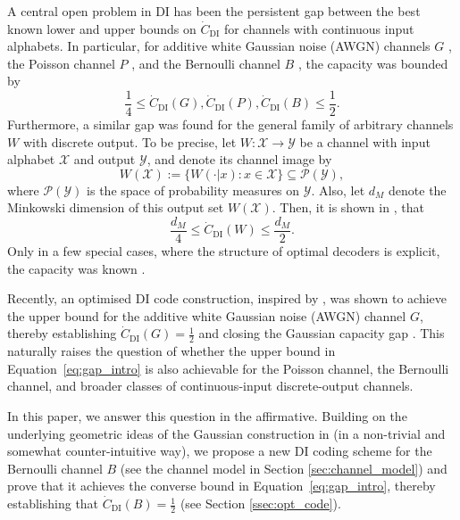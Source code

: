 \documentclass[10pt, conference]{IEEEtran}
\newcommand{\1}{\mathds{1}}
\newcommand{\cP}{\mathcal{P}}
\newcommand{\cX}{\mathcal{X}}
\newcommand{\cY}{\mathcal{Y}}
\begin{document}
A central open problem in DI has been the persistent gap between the best known lower and upper bounds on $\dot C_{\text{DI}}$ for channels with continuous input alphabets. In particular, for additive white Gaussian noise (AWGN) channels $G$ \cite{SPBD:DI_power,DI-fading}, the Poisson channel $P$ \cite{DI-poisson_mc}, and the Bernoulli channel $B$ \cite{CDBW:DI_classical}, the capacity was bounded by
\begin{equation}\label{eq:gap_intro}
    \frac14 \leq \dot C_{\text{DI}}(G), \dot C_{\text{DI}}(P), \dot C_{\text{DI}}(B) \leq \frac12.
\end{equation}
Furthermore, a similar gap was found for the general family of arbitrary channels $W$ with discrete output. To be precise, let $W:\cX\to\cY$ be a channel with input alphabet $\cX$ and output $\cY$, and denote its channel image by
\begin{equation}
W(\cX):=\{W(\cdot|x): x\in\cX\}\subseteq\cP(\cY),
\end{equation}
where $\cP(\cY)$ is the space of probability measures on $\cY$. Also, let $d_M$ denote the Minkowski dimension \cite{Fraser:dimensions,Robinson:dimensions} of this output set $W(\cX)$. Then, it is shown in \cite{CDBW:DI_classical}, that
\begin{equation}\label{eq:gap2_intro}
    \frac{d_M}{4} \leq \dot C_{\text{DI}}(W)\leq  \frac{d_M}{2}.
\end{equation}
Only in a few special cases, where the structure of optimal decoders is explicit, the capacity was known \cite{CDBW:DI_classical,qhtl-arXiv}. 

Recently, an optimised DI code construction, inspired by \cite{galaxy-codes}, was shown to achieve the upper bound for the additive white Gaussian noise (AWGN) channel $G$, thereby establishing $\dot C_{\text{DI}}(G)=\frac12$ and closing the Gaussian capacity gap \cite{CDBW:Gauss}. This naturally raises the question of whether the upper bound in Equation~\eqref{eq:gap_intro} is also achievable for the Poisson channel, the Bernoulli channel, and broader classes of continuous-input discrete-output channels.

In this paper, we answer this question in the affirmative. Building on the underlying geometric ideas of the Gaussian construction in \cite{CDBW:Gauss} (in a non-trivial and somewhat counter-intuitive way), we propose a new DI coding scheme for the Bernoulli channel $B$ (see the channel model in Section \ref{sec:channel_model}) and prove that it achieves the converse bound in Equation~\eqref{eq:gap_intro}, thereby establishing that $\dot C_{\text{DI}}(B)=\frac12$ (see Section \ref{ssec:opt_code}). 
\end{document}
